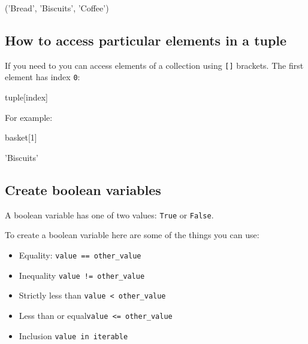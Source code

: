 \begin{raw}
('Bread', 'Biscuits', 'Coffee')
\end{raw}

\subsection{How to access particular elements in a tuple}
\label{sec:how-to-access-particular-elements-in-a-tuple}

If you need to you can access elements of a collection using \texttt{[]} brackets. The
first element has index \texttt{0}:

\begin{pyin}
tuple[index]
\end{pyin}


For example:




\begin{pyin}
basket[1]
\end{pyin}





\begin{raw}
'Biscuits'
\end{raw}





\subsection{Create boolean variables}
\label{sec:create_boolean_variables}

A boolean variable has one of two values: \texttt{True} or \texttt{False}.


To create a boolean variable here are some of the things you can use:
\begin{itemize}
\item 

Equality: \texttt{value == other\_value}

\item 

Inequality \texttt{value != other\_value}

\item 

Strictly less than \texttt{value < other\_value}

\item 

Less than or equal\texttt{value <= other\_value}

\item 

Inclusion \texttt{value in iterable}

\end{itemize}


